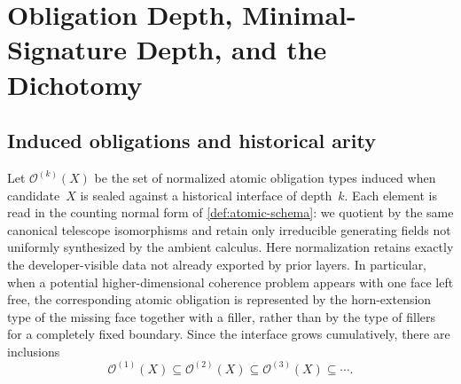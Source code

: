 \documentclass{lmcs}
\newcommand{\Ocal}{\mathcal{O}}
\begin{document}
\section{Obligation Depth, Minimal-Signature Depth, and the Dichotomy}
\label{sec:coherence}

\subsection{Induced obligations and historical arity}

\begin{defi}
\label{def:obligations}
Let $\Ocal^{(k)}(X)$ be the set of normalized atomic obligation types induced when candidate~$X$ is sealed against a historical interface of depth~$k$. Each element is read in the counting normal form of \autoref{def:atomic-schema}: we quotient by the same canonical telescope isomorphisms and retain only irreducible generating fields not uniformly synthesized by the ambient calculus. Here normalization retains exactly the developer-visible data not already exported by prior layers. In particular, when a potential higher-dimensional coherence problem appears with one face left free, the corresponding atomic obligation is represented by the horn-extension type of the missing face together with a filler, rather than by the type of fillers for a completely fixed boundary. Since the interface grows cumulatively, there are inclusions
\[
  \Ocal^{(1)}(X) \subseteq \Ocal^{(2)}(X) \subseteq \Ocal^{(3)}(X) \subseteq \cdots.
\]
\end{defi}
\end{document}
